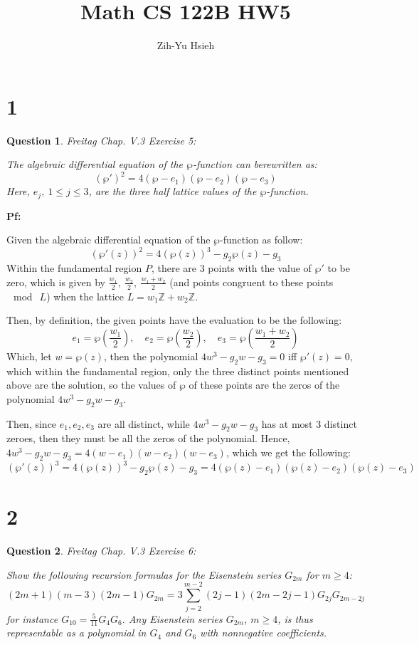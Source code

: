 \documentclass{article}
\title{Math CS 122B HW5}
\author{Zih-Yu Hsieh}
\newtheorem{question}{Question}
\begin{document}
\maketitle

\section*{1}
\begin{myBox}[]{}
    \begin{question}
        Freitag Chap. V.3 Exercise 5:

        The algebraic differential equation of the $\wp$-function can berewritten as:
        $$(\wp')^2 = 4(\wp-e_1)(\wp-e_2)(\wp-e_3)$$
        Here, $e_j,\ 1\leq j\leq 3$, are the three half lattice values of the $\wp$-function.
    \end{question}
\end{myBox}

\textbf{Pf:}

Given the algebraic differential equation of the $\wp$-function as follow:
$$(\wp'(z))^2=4(\wp(z))^3-g_2\wp(z)-g_3$$
Within the fundamental region $P$, there are $3$ points with the value of $\wp'$ to be zero, which is given by $\frac{w_1}{2},\ \frac{w_2}{2},\ \frac{w_1+w_2}{2}$ (and points congruent to these points $\mod\ L$)
when the lattice $L=w_1\mathbb{Z}+w_2\mathbb{Z}$.

Then, by definition, the given points have the evaluation to be the following:
$$e_1=\wp\left(\frac{w_1}{2}\right),\quad e_2=\wp\left(\frac{w_2}{2}\right),\quad e_3=\wp\left(\frac{w_1+w_2}{2}\right)$$
Which, let $w=\wp(z)$, then the polynomial $4w^3-g_2w-g_3=0$ iff $\wp'(z)=0$, which within the fundamental region, only the three distinct points mentioned above are the solution,
so the values of $\wp$ of these points are the zeros of the polynomial $4w^3-g_2w-g_3$.

Then, since $e_1,e_2,e_3$ are all distinct, while $4w^3-g_2w-g_3$ has at most $3$ distinct zeroes, then they must be all the zeros of the polynomial.
Hence, $4w^3-g_2w-g_3 = 4(w-e_1)(w-e_2)(w-e_3)$, which we get the following:
$$(\wp'(z))^3=4(\wp(z))^3-g_2\wp(z)-g_3 = 4(\wp(z)-e_1)(\wp(z)-e_2)(\wp(z)-e_3)$$

\break

\section*{2}
\begin{myBox}[]{}
    \begin{question}
        Freitag Chap. V.3 Exercise 6:

        Show the following recursion formulas for the Eisenstein series $G_{2m}$ for $m\geq 4$:
        $$(2m+1)(m-3)(2m-1)G_{2m}=3\sum_{j=2}^{m-2}(2j-1)(2m-2j-1)G_{2j}G_{2m-2j}$$
        for instance $G_{10}=\frac{5}{11}G_4G_6$. Any Eisenstein series $G_{2m}$, $m\geq 4$, 
        is thus representable as a polynomial in $G_4$ and $G_6$ with nonnegative coefficients.
    \end{question}
\end{myBox}
\end{document}
